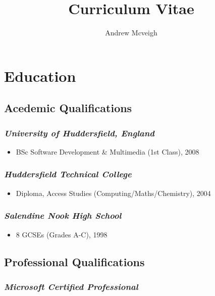 \documentclass{article}
\title{Curriculum Vitae}
\author{Andrew Mcveigh}
\date{}
\begin{document}
\maketitle








\section*{Education}
\label{sec-1}

\subsection*{Acedemic Qualifications}
\label{sec-1.1}

\subsubsection*{\emph{University of Huddersfield, England}}
\label{sec-1.1.1}

\begin{itemize}
\item BSc Software Development \& Multimedia (1st Class), 2008
\end{itemize}
\subsubsection*{\emph{Huddersfield Technical College}}
\label{sec-1.1.2}

\begin{itemize}
\item Diploma, Access Studies (Computing/Maths/Chemistry), 2004
\end{itemize}
\subsubsection*{\emph{Salendine Nook High School}}
\label{sec-1.1.3}

\begin{itemize}
\item 8 GCSEs (Grades A-C), 1998
\end{itemize}
\subsection*{Professional Qualifications}
\label{sec-1.2}

\subsubsection*{\emph{Microsoft Certified Professional}}
\label{sec-1.2.1}
\end{document}
